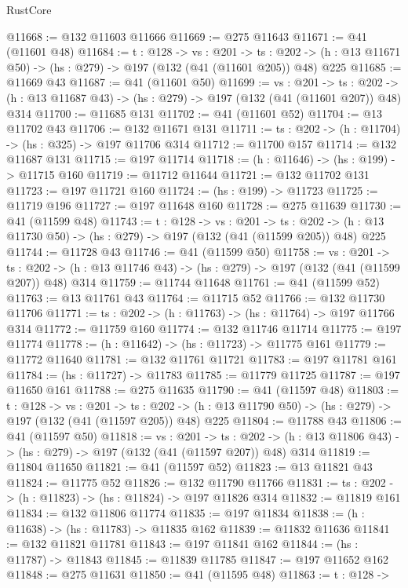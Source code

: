\begin{lexlean}{RustCore}
\begin{coremodule}
@11668 := @132 @11603 @11666
@11669 := @275 @11643
@11671 := @41 (@11601 @48)
@11684 := {t : @128} ->
  {vs : @201} ->
  {ts : @202} -> (h : @13 @11671 @50) -> (hs : @279) -> @197 (@132 (@41 (@11601 @205)) @48) @225
@11685 := @11669 @43
@11687 := @41 (@11601 @50)
@11699 := {vs : @201} ->
  {ts : @202} -> (h : @13 @11687 @43) -> (hs : @279) -> @197 (@132 (@41 (@11601 @207)) @48) @314
@11700 := @11685 @131
@11702 := @41 (@11601 @52)
@11704 := @13 @11702 @43
@11706 := @132 @11671 @131
@11711 := {ts : @202} -> (h : @11704) -> (hs : @325) -> @197 @11706 @314
@11712 := @11700 @157
@11714 := @132 @11687 @131
@11715 := @197 @11714
@11718 := (h : @11646) -> (hs : @199) -> @11715 @160
@11719 := @11712 @11644
@11721 := @132 @11702 @131
@11723 := @197 @11721 @160
@11724 := (hs : @199) -> @11723
@11725 := @11719 @196
@11727 := @197 @11648 @160
@11728 := @275 @11639
@11730 := @41 (@11599 @48)
@11743 := {t : @128} ->
  {vs : @201} ->
  {ts : @202} -> (h : @13 @11730 @50) -> (hs : @279) -> @197 (@132 (@41 (@11599 @205)) @48) @225
@11744 := @11728 @43
@11746 := @41 (@11599 @50)
@11758 := {vs : @201} ->
  {ts : @202} -> (h : @13 @11746 @43) -> (hs : @279) -> @197 (@132 (@41 (@11599 @207)) @48) @314
@11759 := @11744 @11648
@11761 := @41 (@11599 @52)
@11763 := @13 @11761 @43
@11764 := @11715 @52
@11766 := @132 @11730 @11706
@11771 := {ts : @202} -> (h : @11763) -> (hs : @11764) -> @197 @11766 @314
@11772 := @11759 @160
@11774 := @132 @11746 @11714
@11775 := @197 @11774
@11778 := (h : @11642) -> (hs : @11723) -> @11775 @161
@11779 := @11772 @11640
@11781 := @132 @11761 @11721
@11783 := @197 @11781 @161
@11784 := (hs : @11727) -> @11783
@11785 := @11779 @11725
@11787 := @197 @11650 @161
@11788 := @275 @11635
@11790 := @41 (@11597 @48)
@11803 := {t : @128} ->
  {vs : @201} ->
  {ts : @202} -> (h : @13 @11790 @50) -> (hs : @279) -> @197 (@132 (@41 (@11597 @205)) @48) @225
@11804 := @11788 @43
@11806 := @41 (@11597 @50)
@11818 := {vs : @201} ->
  {ts : @202} -> (h : @13 @11806 @43) -> (hs : @279) -> @197 (@132 (@41 (@11597 @207)) @48) @314
@11819 := @11804 @11650
@11821 := @41 (@11597 @52)
@11823 := @13 @11821 @43
@11824 := @11775 @52
@11826 := @132 @11790 @11766
@11831 := {ts : @202} -> (h : @11823) -> (hs : @11824) -> @197 @11826 @314
@11832 := @11819 @161
@11834 := @132 @11806 @11774
@11835 := @197 @11834
@11838 := (h : @11638) -> (hs : @11783) -> @11835 @162
@11839 := @11832 @11636
@11841 := @132 @11821 @11781
@11843 := @197 @11841 @162
@11844 := (hs : @11787) -> @11843
@11845 := @11839 @11785
@11847 := @197 @11652 @162
@11848 := @275 @11631
@11850 := @41 (@11595 @48)
@11863 := {t : @128} ->

\end{coremodule}
\end{lexlean}
